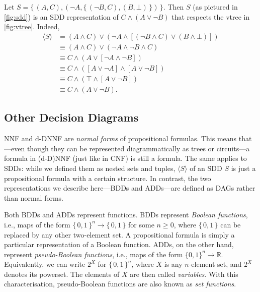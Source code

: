 \begin{example}
  Let $S = \{\, (A, C), (\neg A, \{\, (\neg B, C), (B, \bot) \,\}) \,\}$. Then $S$ (as pictured in \cref{fig:sdd}) is an SDD representation of $C \land (A \lor \neg B)$ that respects the vtree in \cref{fig:vtree}. Indeed,
  \begin{align*}
    \langle S \rangle &= (A \land C) \lor (\neg A \land [(\neg B \land C) \lor (B \land \bot)]) \\
    &\equiv (A \land C) \lor (\neg A \land \neg B \land C) \\
    &\equiv C \land (A \lor [\neg A \land \neg B]) \\
    &\equiv C \land ([A \lor \neg A] \land [A \lor \neg B]) \\
    &\equiv C \land (\top \land [A \lor \neg B]) \\
    &\equiv C \land (A \lor \neg B).
  \end{align*}
\end{example}

\subsection{Other Decision Diagrams} \label{sec:dds}

NNF and d-DNNF are \emph{normal forms} of propositional formulas. This means that---even though they can be represented diagrammatically as trees or circuits---a formula in (d-D)NNF (just like in CNF) is still a formula. The same applies to SDDs: while we defined them as nested sets and tuples, $\langle S \rangle$ of an SDD $S$ is just a propositional formula with a certain structure. In contrast, the two representations we describe here---BDDs and ADDs---are defined as DAGs rather than normal forms.

Both BDDs and ADDs represent functions. BDDs represent \emph{Boolean functions}, i.e., maps of the form $\{\, 0, 1 \,\}^n \to \{\, 0, 1 \,\}$ for some $n \ge 0$, where $\{\, 0, 1 \,\}$ can be replaced by any other two-element set. A propositional formula is simply a particular representation of a Boolean function. ADDs, on the other hand, represent \emph{pseudo-Boolean functions}, i.e., maps of the form $\{ 0, 1 \}^n \to \mathbb{R}$. Equivalently, we can write $2^X$ for $\{\, 0, 1 \,\}^n$, where $X$ is any $n$-element set, and $2^X$ denotes its powerset. The elements of $X$ are then called \emph{variables}. With this characterisation, pseudo-Boolean functions are also known as \emph{set functions}.

